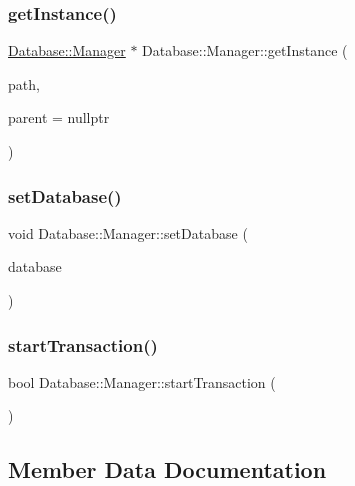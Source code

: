 \subsubsection{\texorpdfstring{get\+Instance()}{getInstance()}}
{\footnotesize\ttfamily \mbox{\hyperlink{classDatabase_1_1Manager}{Database\+::\+Manager}} $\ast$ Database\+::\+Manager\+::get\+Instance (\begin{DoxyParamCaption}\item[{const Q\+String \&}]{path,  }\item[{Q\+Object $\ast$}]{parent = {\ttfamily nullptr} }\end{DoxyParamCaption})\hspace{0.3cm}{\ttfamily [static]}}

\mbox{\label{classDatabase_1_1Manager_af7f86ed5807bd6299fe4aa594b72013c}} 
\subsubsection{\texorpdfstring{set\+Database()}{setDatabase()}}
{\footnotesize\ttfamily void Database\+::\+Manager\+::set\+Database (\begin{DoxyParamCaption}\item[{const Q\+Sql\+Database \&}]{database }\end{DoxyParamCaption})\hspace{0.3cm}{\ttfamily [private]}}

\mbox{\label{classDatabase_1_1Manager_adbe8be75b47c9770556464859bcc3017}} 
\subsubsection{\texorpdfstring{start\+Transaction()}{startTransaction()}}
{\footnotesize\ttfamily bool Database\+::\+Manager\+::start\+Transaction (\begin{DoxyParamCaption}{ }\end{DoxyParamCaption})}



\subsection{Member Data Documentation}
\mbox{\label{classDatabase_1_1Manager_a4de33edd790c0d8320c0a2a5990f5169}} 
